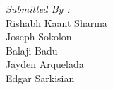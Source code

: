 \documentclass[12pt]{article}
\begin{document}
\begin{titlepage}
\begin{minipage}{0.4\textwidth}
			\begin{flushright} \large
			\emph{Submitted By :} \\
			Rishabh Kaant Sharma\\
            Joseph Sokolon\\
            Balaji Badu\\
            Jayden Arquelada\\
            Edgar Sarkisian\\
		\end{flushright}
        
	\end{minipage}\\[2 cm]
	
	
    
    
    
    
	
\end{titlepage}


\textcolor{black}{\tableofcontents}
\pagebreak

\end{document}
